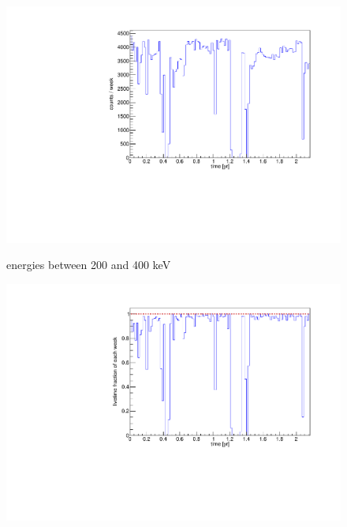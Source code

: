 \begin{figure}[t!]
	\centering
	\begin{minipage}[t]{.475\textwidth}
		\centering
		\includegraphics[width=\textwidth]{./Bilder/ZeitverlaufLimits.pdf}
		\caption{energies between 200 and 400 keV}
		\label{fig:ZeitLimits}
	\end{minipage}\hfill%
	
	\begin{minipage}[t]{.475\textwidth}
		\centering
		\includegraphics[width=\textwidth]{./Bilder/onceInALivetime.pdf}
		\caption{}
		
		\label{fig:livetime}
	\end{minipage}\hfill%
\end{figure}

